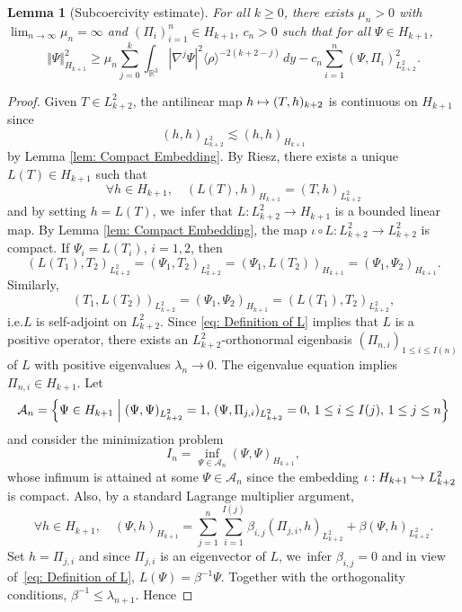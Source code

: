 \documentclass[10pt]{article}
\newcommand{\ie}{i.e.}
\newcommand\mto{\mathchoice{\longmapsto}{\mapsto}{\mapsto}{\mapsto}}
\newcommand\hto{\mathrel{\lhook\joinrel\to}}
\theoremstyle{plain}
\newtheorem{lemma}[proposition]{Lemma}
\theoremstyle{definition}
\begin{document}
\begin{lemma}[Subcoercivity estimate]
\label{lem: Subcoercivity Estimate}
For all $k\ge0$, there exists $\mu_n>0$ with $\lim_{n\to\infty }\mu_n=\infty$ and $(\Pi_i)_{i=1}^{n}\in H_{k+1}$, $c_n>0$ such that for all $\Psi\in H_{k+1}$,
\begin{equation}
\label{eq: Coercivity}
\Vert \Psi\Vert_{H_{k+1}}^2 \ge \mu_n\sum_{j=0}^{k} \int_{\mathbb R^3}|\nabla^j \Psi|^2\langle \rho\rangle ^{-2(k+2-j)}\,dy-c_n\sum_{i=1}^{n}(\Psi,\Pi_i)_{L_{k+2}^2}^2.
\end{equation}
\end{lemma}
\begin{proof}
Given $T\in L_{k+2}^2$, the antilinear map $h\mto (T,h)_{k+2}$ is continuous on $H_{k+1}$ since
\[
(h,h)_{L_{k+2}^2}\lesssim ( h,h)_{H_{k+1}}
\]
by Lemma \ref{lem: Compact Embedding}. By Riesz, there exists a unique $L(T)\in H_{k+1}$ such that
\begin{equation}
\label{eq: Definition of L}
\forall h\in H_{k+1},\quad ( L(T),h)_{H_{k+1}}=(T,h)_{L_{k+2}^2}
\end{equation}
and by setting $h=L(T)$, we~infer that $L: L_{k+2}^2\to H_{k+1}$ is a bounded linear map. By Lemma \ref{lem: Compact Embedding}, the map $\iota\circ L:L_{k+2}^2\to L_{k+2}^2$ is compact. If $\Psi_i=L(T_i)$, $i=1,2$, then
\[
(L(T_1),T_2)_{L_{k+2}^2}=(\Psi_1,T_2)_{L_{k+2}^2}=(\Psi_1,L(T_2))_{H_{k+1}}= ( \Psi_1,\Psi_2 )_{H_{k+1}}.
\]
Similarly,
\[
(T_1,L(T_2))_{L_{k+2}^2}=( \Psi_1,\Psi_2 )_{H_{k+1}}=(L(T_1),T_2)_{L_{k+2}^2},
\]
\ie $L$ is self-adjoint on $L_{k+2}^2$. Since \eqref{eq: Definition of L} implies that $L$ is a positive operator, there exists an $L_{k+2}^2$-orthonormal eigenbasis $(\Pi_{n,i})_{1\le i\le I(n)}$ of $L$ with positive eigenvalues $\lambda_n\to0$. The eigenvalue equation implies $\Pi_{n,i}\in H_{k+1}$. Let
\[
\mathcal A_n=\Big\{\Psi\in H_{k+1} \Bigm| (\Psi,\Psi)_{L_{k+2}^2}=1,\, (\Psi,\Pi_{j,i})_{L_{k+2}^2}=0,\,1\le i\le I(j),\, 1\le j\le n\Big\}
\]
and consider the minimization problem\vspace*{-3pt}
\[
I_n=\inf_{\Psi\in \mathcal A_n}(\Psi,\Psi)_{H_{k+1}},
\]
whose infimum is attained at some $\Psi\in \mathcal A_n$ since the embedding $\iota:H_{k+1}\hto  L_{k+2}^2$ is compact. Also, by a standard Lagrange multiplier argument,\vspace*{-3pt}
\[
\forall h\in H_{k+1},\quad( \Psi,h)_{H_{k+1}}=\sum_{j=1}^n\sum_{i=1}^{I(j)}\beta_{i,j}(\Pi_{j,i},h)_{L_{k+2}^2}+\beta(\Psi,h)_{L_{k+2}^2}.
\]
Set $h=\Pi_{j,i}$ and since $\Pi_{j,i}$ is an eigenvector of $L$, we~infer $\beta_{i,j}=0$ and in view of~\eqref{eq: Definition of L}, $L(\Psi)=\beta^{-1}\Psi$. Together with the orthogonality conditions, $\beta^{-1}\le \lambda_{n+1}$. Hence\vspace*{-3pt}

\end{proof}
\end{document}
